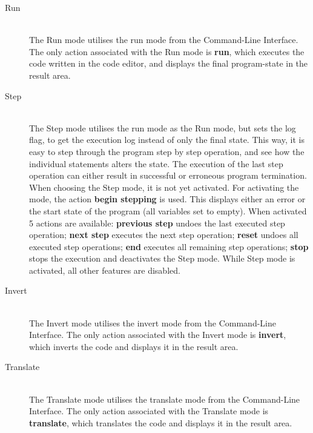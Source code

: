 \begin{description}

  \item[Run]~\\
    The Run mode utilises the run mode from the Command-Line Interface. The only action associated with the Run mode is  \textbf{run}, which executes the code written in the code editor, and displays the final program-state in the result area.

  \item[Step]~\\
    The Step mode utilises the run mode as the Run mode, but sets the \-\-log flag, to get the execution log instead of only the final state. This way, it is easy to step through the program step by step operation, and see how the individual statements alters the state.
    The execution of the last step operation can either result in successful or erroneous program termination.
    When choosing the Step mode, it is not yet activated.
    For activating the mode, the action  \textbf{begin stepping} is used.
    This displays either an error or the start state of the program (all variables set to empty).
    When activated 5 actions are available:
     \textbf{previous step} undoes the last executed step operation;
     \textbf{next step} executes the next step operation;
     \textbf{reset} undoes all executed step operations;
     \textbf{end} executes all remaining step operations;
     \textbf{stop} stops the execution and deactivates the Step mode.
    While Step mode is activated, all other features are disabled.

  \item[Invert]~\\
    The Invert mode utilises the invert mode from the Command-Line Interface. The only action associated with the Invert mode is  \textbf{invert}, which inverts the code and displays it in the result area.

  \item[Translate]~\\
    The Translate mode utilises the translate mode from the Command-Line Interface.
    The only action associated with the Translate mode is  \textbf{translate}, which translates the code and displays it in the result area.

\end{description}

